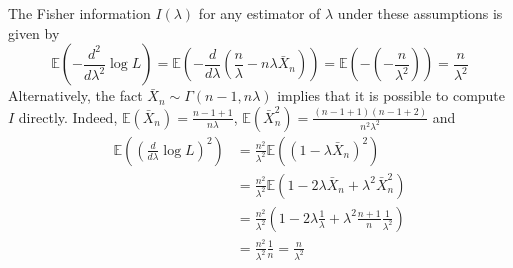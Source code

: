 \documentclass[a4paper]{article}
\newcommand{\brac}[1]{\left ( #1 \right )}
\newcommand{\Ex}[1]{\mathbb{E}\brac{#1}}
\begin{document}
The Fisher information $I\brac{\lambda}$ for any estimator of $\lambda$ under these assumptions is given by \[\Ex{-\frac{d^2}{d\lambda^2} \log L} = \Ex{ - \frac{d}{d\lambda}\brac{ \frac{n}{\lambda} - n\lambda \bar{X}_n }}  = \Ex{ -\brac{ -\frac{n}{\lambda^2} }} = \frac{n}{\lambda^2}\] Alternatively, the fact $\bar{X}_n\sim \Gamma\brac{n-1, n\lambda}$ implies that it is possible to compute $I$ directly. Indeed, $\Ex{\bar{X}_n} = \frac{n-1+1}{n\lambda}$, $\Ex{\bar{X}_n^2} = \frac{\brac{n-1+1}\brac{n-1+2}}{n^2 \lambda^2}$ and \begin{align*}
\Ex{\brac{\frac{d}{d\lambda} \log L}^2} &= \frac{n^2}{\lambda^2} \Ex{ \brac{1 - \lambda \bar{X}_n }^2 } \\ &= \frac{n^2}{\lambda^2} \Ex{1-2\lambda \bar{X}_n + \lambda^2 \bar{X}_n^2 } \\ &= \frac{n^2}{\lambda^2} \brac{1-2\lambda \frac{1}{\lambda} + \lambda^2 \frac{n+1}{n}\frac{1}{\lambda^2} }\\ &= \frac{n^2}{\lambda^2} \frac{1}{n} = \frac{n}{\lambda^2}\end{align*} 
\end{document}
